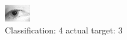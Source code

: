 \begin{figure}[h!]
\begin{center}
\includegraphics[width=0.60\columnwidth]{figures/ID1314_class_4_target_3.png}
\end{center}
\caption{ Classification: 4 actual target: 3}
\label{fig:ID1314_class_4_target_3}
\end{figure}
